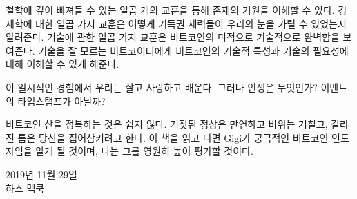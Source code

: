 철학에 깊이 빠져들 수 있는 일곱 개의 교훈을 통해 존재의 기원을 이해할 수 있다. 
경제학에 대한 일곱 가지 교훈은 어떻게 기득권 세력들이 우리의 눈을 가릴 수 있었는지 알려준다. 
기술에 관한 일곱 가지 교훈은 비트코인의 미적으로 기술적으로 완벽함을 보여준다.
기술을 잘 모르는 비트코이너에게 비트코인의 기술적 특성과 기술의 필요성에 대해 이해할 수 있게 해준다.


이 일시적인 경험에서 우리는 살고 사랑하고 배운다. 
그러나 인생은 무엇인가? 이벤트의 타임스탬프가 아닐까?


비트코인 산을 정복하는 것은 쉽지 않다. 
거짓된 정상은 만연하고 바위는 거칠고, 갈라진 틈은 당신을 집어삼키려고 한다.
이 책을 읽고 나면 Gigi가 궁극적인 비트코인 인도자임을 알게 될 것이며, 
나는 그를 영원히 높이 평가할 것이다.


\begin{flushright}
  2019년 11월 29일 \\
  하스 맥쿡
\end{flushright}
